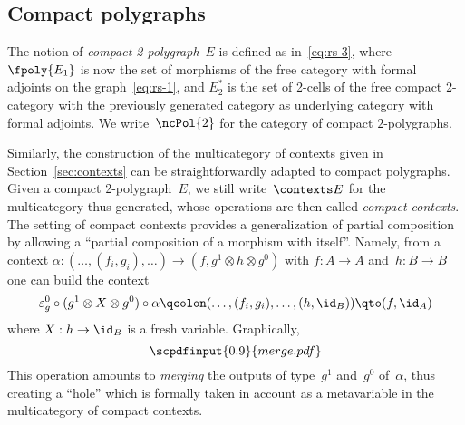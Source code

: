 \documentclass{LMCS}
\newcommand{\strid}[1]{\scpdfinput{0.9}{#1.pdf}}
\begin{document}
\subsection{Compact polygraphs}
\label{sec:compact-pol}
The notion of \emph{compact 2-polygraph}~$E$ is defined as in~\eqref{eq:rs-3},
where~$\fpoly{E_1}$
is now the set of
morphisms of the free category with formal adjoints on the
graph~\eqref{eq:rs-1}, and $E_2^*$ is the set of 2-cells of the free compact
2-category with the previously generated category as underlying category with
formal adjoints. We write~$\ncPol{2}$ for the category of compact
$2$-polygraphs.













Similarly, the construction of the multicategory of contexts given in
Section~\ref{sec:contexts} can be straightforwardly adapted to compact
polygraphs. Given a compact 2-polygraph~$E$, we still write~$\contexts E$ for
the multicategory thus generated, whose operations are then called \emph{compact
  contexts}. The setting of compact contexts provides a generalization of
partial composition by allowing a ``partial composition of a morphism with
itself''. Namely, from a context
\hbox{$\alpha:(\ldots,(f_i,g_i),\ldots)\to(f,g^1\otimes h\otimes g^0)$} with
\hbox{$f:A\to A$} and~$h:B\to B$ one can build the context
\[
\varepsilon_g^0\circ(g^1\otimes X\otimes g^0)\circ\alpha
\qcolon
(\ldots,(f_i,g_i),\ldots,(h,\id_B))
\qto
(f,\id_A)
\]
where \hbox{$X:h\to\id_B$} is a fresh variable. Graphically,
\[
\strid{merge}
\]
This operation amounts to \emph{merging} the outputs of type~$g^1$ and~$g^0$
of~$\alpha$, thus creating a ``hole'' which is formally taken in account as a
metavariable in the multicategory of compact contexts.
\end{document}
